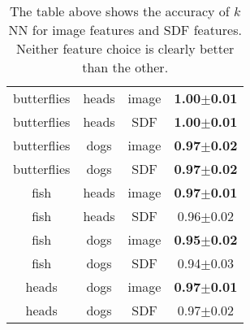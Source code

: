 \documentclass[anon,11pt]{9520} %
\begin{document}
\begin{table}
\begin{center}
\begin{tabular}{|c|c|c|c|}
butterflies&	heads&	image&	\textbf{1.00$\pm$0.01}\\
butterflies&	heads&	SDF&	\textbf{1.00$\pm$0.01}\\\hline

butterflies&	dogs&	image&	\textbf{0.97$\pm$0.02}\\
butterflies&	dogs&	SDF&	\textbf{0.97$\pm$0.02}\\\hline

fish&		heads&	image&	\textbf{0.97$\pm$0.01}\\
fish&		heads&	SDF&	0.96$\pm$0.02\\\hline

fish&		dogs&	image&	\textbf{0.95$\pm$0.02}\\
fish&		dogs&	SDF&	0.94$\pm$0.03\\\hline

heads&		dogs&	image&	\textbf{0.97$\pm$0.01}\\
heads&		dogs&	SDF&	0.97$\pm$0.02\\\hline
\end{tabular}
\end{center}
\caption{\label{tbl:knn_features} The table above shows the accuracy of $k$NN for
  image features and SDF features. Neither feature choice is clearly better than
  the other.}
\end{table}
\end{document}
